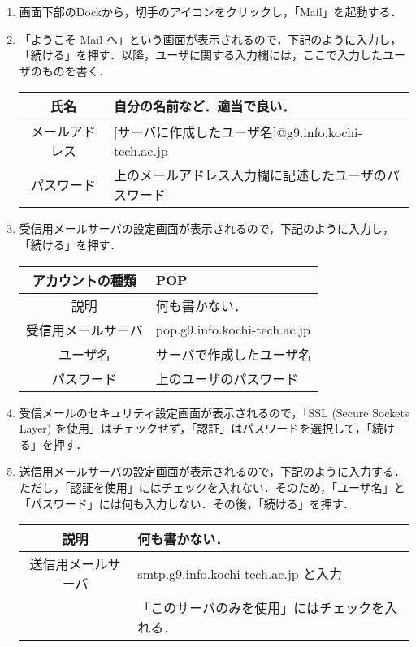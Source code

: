 \documentclass[a4j,titlepage]{jarticle}
\begin{document}
\begin{enumerate}
\item 画面下部のDockから，切手のアイコンをクリックし，「Mail」を起動する．

\item 「ようこそ Mail へ」という画面が表示されるので，下記のように入力し，「続ける」を押す．以降，ユーザに関する入力欄には，ここで入力したユーザのものを書く．
\begin{table}[htbp]
  \begin{center}
    \begin{tabular}{|c|l|} \hline
      氏名 & 自分の名前など．適当で良い． \\ \hline
      メールアドレス & [サーバに作成したユーザ名]@g9.info.kochi-tech.ac.jp \\ \hline
      パスワード & 上のメールアドレス入力欄に記述したユーザのパスワード \\ \hline
    \end{tabular}
  \end{center}
\end{table}

\item 受信用メールサーバの設定画面が表示されるので，下記のように入力し，「続ける」を押す．
\begin{table}[htbp]
  \begin{center}
    \begin{tabular}{|c|l|} \hline
      アカウントの種類 & POP \\ \hline
      説明 & 何も書かない． \\ \hline
      受信用メールサーバ & pop.g9.info.kochi-tech.ac.jp \\ \hline
      ユーザ名 & サーバで作成したユーザ名 \\ \hline
      パスワード & 上のユーザのパスワード \\ \hline
    \end{tabular}
  \end{center}
\end{table}

\item 受信メールのセキュリティ設定画面が表示されるので，「SSL (Secure Sockets Layer) を使用」はチェックせず，「認証」はパスワードを選択して，「続ける」を押す．

\item 送信用メールサーバの設定画面が表示されるので，下記のように入力する．ただし，「認証を使用」にはチェックを入れない．そのため，「ユーザ名」と「パスワード」には何も入力しない．その後，「続ける」を押す．
\begin{table}[htbp]
  \begin{center}
    \begin{tabular}{|c|l|} \hline
      説明 & 何も書かない． \\ \hline
      送信用メールサーバ & smtp.g9.info.kochi-tech.ac.jp と入力 \\
      & 「このサーバのみを使用」にはチェックを入れる．\\ \hline
    \end{tabular}
  \end{center}
\end{table}


\end{enumerate}
\end{document}
